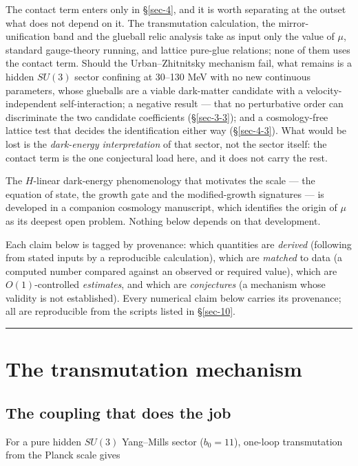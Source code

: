 \documentclass[preprint,12pt]{elsarticle}
\begin{document}
The contact term enters only in §\ref{sec-4}, and it is worth separating
at the outset what does not depend on it. The transmutation calculation,
the mirror-unification band and the glueball relic analysis take as
input only the value of \(\mu\), standard gauge-theory running, and
lattice pure-glue relations; none of them uses the contact term. Should
the Urban--Zhitnitsky mechanism fail, what remains is a hidden \(SU(3)\)
sector confining at 30--130 MeV with no new continuous parameters, whose
glueballs are a viable dark-matter candidate with a velocity-independent
self-interaction; a negative result --- that no perturbative order can
discriminate the two candidate coefficients (§\ref{sec-3-3}); and a
cosmology-free lattice test that decides the identification either way
(§\ref{sec-4-3}). What would be lost is the \emph{dark-energy
interpretation} of that sector, not the sector itself: the contact term
is the one conjectural load here, and it does not carry the rest.

The \(H\)-linear dark-energy phenomenology that motivates the scale ---
the equation of state, the growth gate and the modified-growth
signatures --- is developed in a companion cosmology manuscript, which
identifies the origin of \(\mu\) as its deepest open problem. Nothing
below depends on that development.

Each claim below is tagged by provenance: which quantities are
\emph{derived} (following from stated inputs by a reproducible
calculation), which are \emph{matched} to data (a computed number
compared against an observed or required value), which are
\(O(1)\)-controlled \emph{estimates}, and which are \emph{conjectures}
(a mechanism whose validity is not established). Every numerical claim
below carries its provenance; all are reproducible from the scripts
listed in §\ref{sec-10}.

\begin{center}\rule{0.5\linewidth}{0.5pt}\end{center}

\section{The transmutation mechanism}\label{sec-2}

\subsection{The coupling that does the job}\label{sec-2-1}

For a pure hidden \(SU(3)\) Yang--Mills sector (\(b_0 = 11\)), one-loop
transmutation from the Planck scale gives
\end{document}
